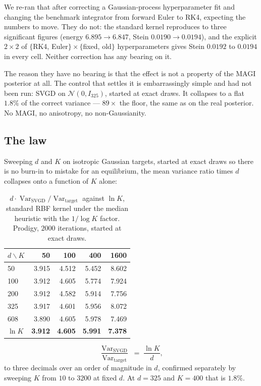 \documentclass[11pt]{article}
\newcommand{\Var}{\operatorname{Var}}
\theoremstyle{remark}
\begin{document}
We re-ran that after correcting a Gaussian-process hyperparameter fit and changing the benchmark
integrator from forward Euler to RK4, expecting the numbers to move. They do not: the standard
kernel reproduces to three significant figures (energy $6.895 \to 6.847$, Stein $0.0190 \to
0.0194$), and the explicit $2\times2$ of $\{$RK4, Euler$\}\times\{$fixed, old$\}$ hyperparameters
gives Stein $0.0192$ to $0.0194$ in every cell. Neither correction has any bearing on it.

The reason they have no bearing is that the effect is not a property of the MAGI posterior at all.
The control that settles it is embarrassingly simple and had not been run: SVGD on
$\mathcal N(0, I_{325})$, started at exact draws. It collapses to a flat $1.8\%$ of the correct
variance --- $89\times$ the floor, the same as on the real posterior. No MAGI, no anisotropy, no
non-Gaussianity.

\subsection{The law}

Sweeping $d$ and $K$ on isotropic Gaussian targets, started at exact draws so there is no burn-in
to mistake for an equilibrium, the mean variance ratio times $d$ collapses onto a function of $K$
alone:

\begin{table}[t]
\centering\small
\begin{tabular}{lrrrr}
\toprule
$d \backslash K$ & 50 & 100 & 400 & 1600\\
\midrule
50   & 3.915 & 4.512 & 5.452 & 8.602\\
100  & 3.912 & 4.605 & 5.774 & 7.924\\
200  & 3.912 & 4.582 & 5.914 & 7.756\\
325  & 3.917 & 4.601 & 5.956 & 8.072\\
608  & 3.890 & 4.605 & 5.978 & 7.469\\
\midrule
$\ln K$ & \textbf{3.912} & \textbf{4.605} & \textbf{5.991} & \textbf{7.378}\\
\bottomrule
\end{tabular}
\caption{$d \cdot \Var_{\mathrm{SVGD}}/\Var_{\mathrm{target}}$ against $\ln K$, standard RBF kernel
under the median heuristic with the $1/\log K$ factor. Prodigy, $2000$ iterations, started at exact
draws.}
\label{tab:law}
\end{table}

\begin{equation}
\label{eq:law}
  \frac{\Var_{\mathrm{SVGD}}}{\Var_{\mathrm{target}}} \;=\; \frac{\ln K}{d},
\end{equation}
to three decimals over an order of magnitude in $d$, confirmed separately by sweeping $K$ from $10$
to $3200$ at fixed $d$. At $d = 325$ and $K = 400$ that is $1.8\%$.
\end{document}
